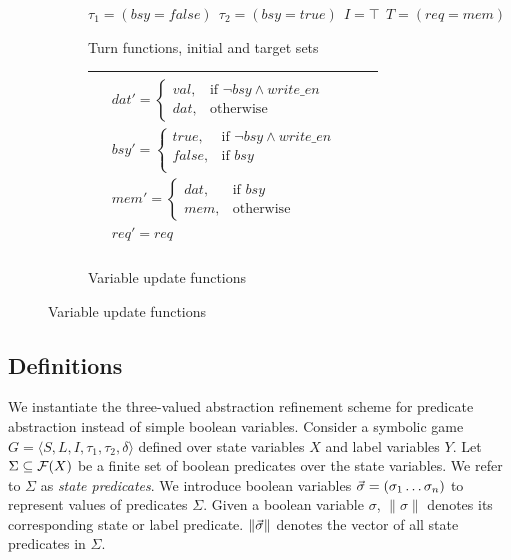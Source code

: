 \begin{figure}
    \centering
    \caption{Game specification}
    \label{fig:ex_game_specification}
    \begin{subfigure}{\linewidth}
    \caption{Turn functions, initial and target sets}
    $\tau_1=(bsy=false)~~\tau_2=(bsy=true)~~I=\top~~T=(req=mem)$
    \end{subfigure}

    \begin{subfigure}{\linewidth}
    \caption{Variable update functions}
    \begin{tabular}{|p{0.9\linewidth}|}
        \hline
        $
        \begin{aligned}
            &dat' = \begin{cases}
                        val, & \text{if } \neg bsy \wedge write\_en \\
                        dat, & \text{otherwise}
                    \end{cases}\\
            &bsy' = \begin{cases} 
                        true,   & \text{if } \neg bsy \wedge write\_en \\
                        false,  & \text{if } bsy \\
                    \end{cases}\\
            &mem' = \begin{cases}
                        dat, & \text{if } bsy \\
                        mem, & \text{otherwise}
                    \end{cases}\\
            &req' = req\\
        \end{aligned}
        $ \\
        \hline
    \end{tabular}
    \end{subfigure}

\end{figure}

\subsection{Definitions}

We instantiate the three-valued abstraction refinement scheme for predicate abstraction instead of simple boolean variables. Consider a symbolic game $G = \langle S, L, I, \tau_1, \tau_2, \delta \rangle$ defined over state variables $X$ and label variables $Y$. Let $\Sigma\subseteq\mathcal{F}(X)$ be a finite set of boolean predicates over the state variables. We refer to $\Sigma$ as \emph{state predicates}. We introduce boolean variables $\vec{\sigma}=(\sigma_1\ldots\sigma_n)$ to represent values of predicates $\Sigma$. Given a boolean variable $\sigma$, $\|\sigma\|$ denotes its corresponding state or label predicate. $\|\vec{\sigma}\|$ denotes the vector of all state predicates in $\Sigma$.


